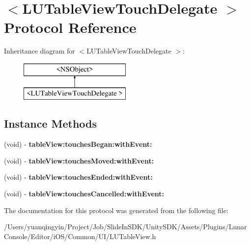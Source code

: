 \hypertarget{protocol_l_u_table_view_touch_delegate_01-p}{}\section{$<$L\+U\+Table\+View\+Touch\+Delegate $>$ Protocol Reference}
\label{protocol_l_u_table_view_touch_delegate_01-p}
Inheritance diagram for $<$L\+U\+Table\+View\+Touch\+Delegate $>$\+:\begin{figure}[H]
\begin{center}
\leavevmode
\includegraphics[height=2.000000cm]{protocol_l_u_table_view_touch_delegate_01-p}
\end{center}
\end{figure}
\subsection*{Instance Methods}
\begin{DoxyCompactItemize}
\item 
\mbox{\label{protocol_l_u_table_view_touch_delegate_01-p_adddc3c3940192ff3154597dc9166ef60}} 
(void) -\/ {\bfseries table\+View\+:touches\+Began\+:with\+Event\+:}
\item 
\mbox{\label{protocol_l_u_table_view_touch_delegate_01-p_a6b578124d6fb7e1a07ec1d0264d7c20d}} 
(void) -\/ {\bfseries table\+View\+:touches\+Moved\+:with\+Event\+:}
\item 
\mbox{\label{protocol_l_u_table_view_touch_delegate_01-p_a230ef865cf1f4ea83748ff781e2ebfed}} 
(void) -\/ {\bfseries table\+View\+:touches\+Ended\+:with\+Event\+:}
\item 
\mbox{\label{protocol_l_u_table_view_touch_delegate_01-p_a3de9e82c548be030b1311faaf4a0c721}} 
(void) -\/ {\bfseries table\+View\+:touches\+Cancelled\+:with\+Event\+:}
\end{DoxyCompactItemize}


The documentation for this protocol was generated from the following file\+:\begin{DoxyCompactItemize}
\item 
/\+Users/yuanqingyin/\+Project/\+Job/\+Slide\+In\+S\+D\+K/\+Unity\+S\+D\+K/\+Assets/\+Plugins/\+Lunar\+Console/\+Editor/i\+O\+S/\+Common/\+U\+I/L\+U\+Table\+View.\+h\end{DoxyCompactItemize}
